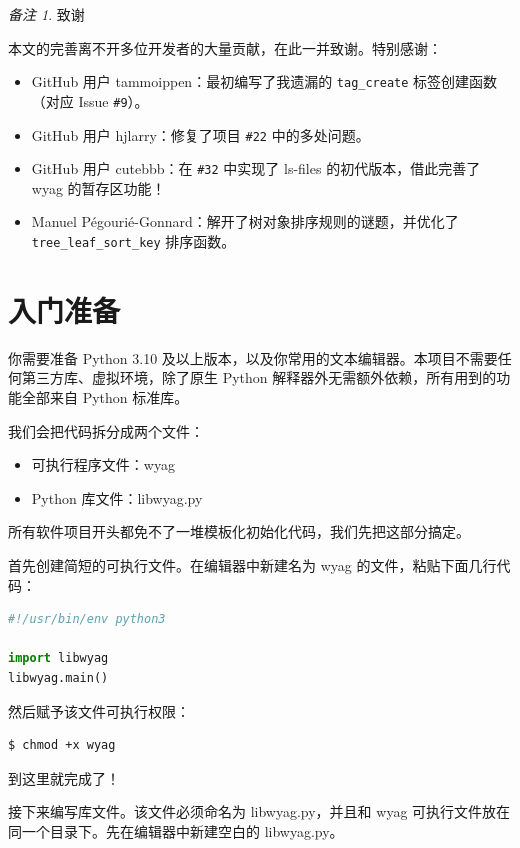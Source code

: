 \documentclass{ctexart}
\theoremstyle{remark}
\newtheorem*{remark}{备注}
\theoremstyle{warningstyle}
\theoremstyle{warningstyle}
\begin{document}
\begin{remark}
致谢

本文的完善离不开多位开发者的大量贡献，在此一并致谢。特别感谢：
\begin{itemize}
    \item GitHub 用户 tammoippen：最初编写了我遗漏的 \verb|tag_create| 标签创建函数（对应 Issue \verb|#9|）。
    \item GitHub 用户 hjlarry：修复了项目 \verb|#22| 中的多处问题。
    \item GitHub 用户 cutebbb：在 \verb|#32| 中实现了 ls-files 的初代版本，借此完善了 wyag 的暂存区功能！
    \item Manuel Pégourié-Gonnard：解开了树对象排序规则的谜题，并优化了 \verb|tree_leaf_sort_key| 排序函数。
\end{itemize}
\end{remark}

\section{入门准备}

你需要准备 Python 3.10 及以上版本，以及你常用的文本编辑器。本项目不需要任何第三方库、虚拟环境，除了原生 Python 解释器外无需额外依赖，所有用到的功能全部来自 Python 标准库。

我们会把代码拆分成两个文件：
\begin{itemize}
    \item 可执行程序文件：wyag
    \item Python 库文件：libwyag.py
\end{itemize}
所有软件项目开头都免不了一堆模板化初始化代码，我们先把这部分搞定。

首先创建简短的可执行文件。在编辑器中新建名为 wyag 的文件，粘贴下面几行代码：
\begin{lstlisting}[language=Python]
#!/usr/bin/env python3

import libwyag
libwyag.main()
\end{lstlisting}
然后赋予该文件可执行权限：
\begin{lstlisting}[language=bash]
$ chmod +x wyag
\end{lstlisting}
到这里就完成了！

接下来编写库文件。该文件必须命名为 libwyag.py，并且和 wyag 可执行文件放在同一个目录下。先在编辑器中新建空白的 libwyag.py。
\end{document}
